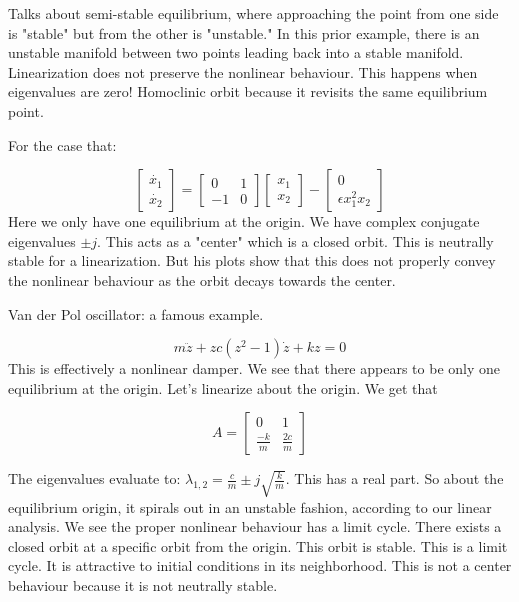 \documentclass[11pt]{article}
\begin{document}
Talks about semi-stable equilibrium, where approaching the point from one side is "stable" but from the other is "unstable." In this prior example, there is an unstable manifold between two points leading back into a stable manifold. Linearization does not preserve the nonlinear behaviour. This happens when eigenvalues are zero! Homoclinic orbit because it revisits the same equilibrium point.

For the case that:

\begin{equation}
\begin{bmatrix}
\dot{x_1} \\
\dot{x_2}
\end{bmatrix}
=
\begin{bmatrix}
0 & 1 \\
-1 & 0
\end{bmatrix}
\begin{bmatrix}
{x_1} \\
{x_2}
\end{bmatrix}
-
\begin{bmatrix}
0 \\
\epsilon x_1^2 x_2
\end{bmatrix}
\end{equation}
Here we only have one equilibrium at the origin. We have complex conjugate eigenvalues $\pm j$. This acts as a "center" which is a closed orbit. This is neutrally stable for a linearization. But his plots show that this does not properly convey the nonlinear behaviour as the orbit decays towards the center.

Van der Pol oscillator: a famous example.

\begin{equation}
m\ddot{z} + zc(z^2-1)\dot{z} + kz =0	
\end{equation}
This is effectively a nonlinear damper. We see that there appears to be only one equilibrium at the origin. Let's linearize about the origin. We get that 


\begin{equation}A = 
\begin{bmatrix}
0 & 1\\
\frac{-k}{m} & \frac{2c}{m}
\end{bmatrix}
\end{equation}

The eigenvalues evaluate to: $\lambda_{1,2} = \frac{c}{m}\pm j \sqrt{\frac{k}{m}}$. This has a real part. So about the equilibrium origin, it spirals out in an unstable fashion, according to our linear analysis. We see the proper nonlinear behaviour has a limit cycle. There exists a closed orbit at a specific orbit from the origin. This orbit is stable. This is a limit cycle. It is attractive to initial conditions in its neighborhood. This is not a center behaviour because it is not neutrally stable. 
\end{document}
